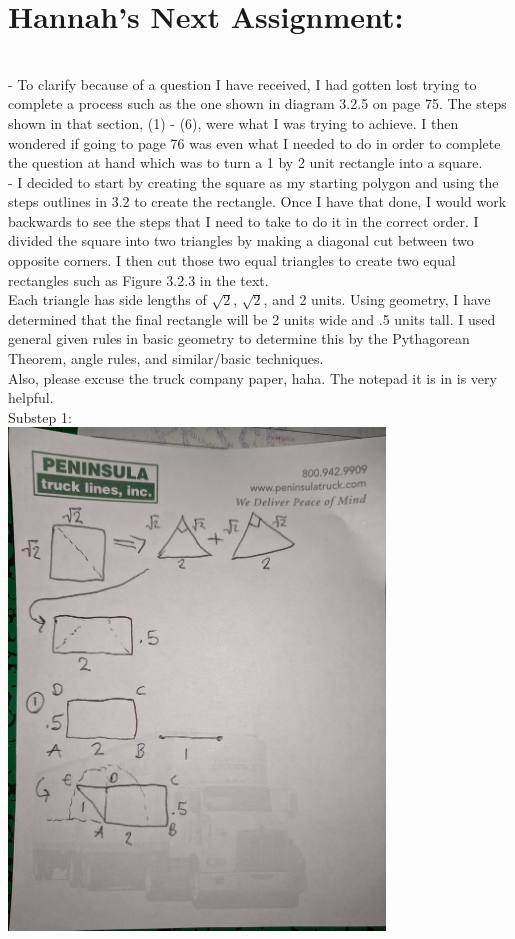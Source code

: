 \documentclass{article}
\begin{document}
\section*{Hannah's Next Assignment:}\\
- To clarify because of a question I have received, I had gotten lost trying to complete a process such as the one shown in diagram 3.2.5 on page 75. The steps shown in that section, (1) - (6), were what I was trying to achieve. I then wondered if going to page 76 was even what I needed to do in order to complete the question at hand which was to turn a 1 by 2 unit rectangle into a square.\\

- I decided to start by creating the square as my starting polygon and using the steps outlines in 3.2 to create the rectangle. Once I have that done, I would work backwards to see the steps that I need to take to do it in the correct order. I divided the square into two triangles by making a diagonal cut between two opposite corners. I then cut those two equal triangles to create two equal rectangles such as Figure 3.2.3 in the text.\\
Each triangle has side lengths of $\sqrt{2}$, $\sqrt{2}$, and 2 units. Using geometry, I have determined that the final rectangle will be 2 units wide and .5 units tall. I used general given rules in basic geometry to determine this by the Pythagorean Theorem, angle rules, and similar/basic techniques. \\
Also, please excuse the truck company paper, haha. The notepad it is in is very helpful.\\
Substep 1:\\
\includegraphics[width=10cm]{Ex 5.jpg}\\
\end{document}
